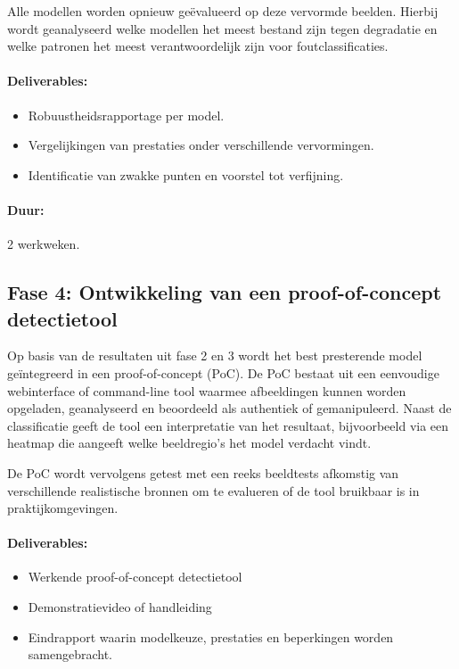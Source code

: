 \documentclass{hogent-article}
\begin{document}
Alle modellen worden opnieuw geëvalueerd op deze vervormde beelden. Hierbij wordt geanalyseerd welke modellen het meest bestand zijn tegen degradatie en welke patronen het meest verantwoordelijk zijn voor foutclassificaties.

\paragraph{Deliverables:}
\begin{itemize}
    \item Robuustheidsrapportage per model.
    \item Vergelijkingen van prestaties onder verschillende vervormingen.
    \item Identificatie van zwakke punten en voorstel tot verfijning.
\end{itemize}

\paragraph{Duur:} 2 werkweken.

\subsection{Fase 4: Ontwikkeling van een proof-of-concept detectietool}

Op basis van de resultaten uit fase 2 en 3 wordt het best presterende model geïntegreerd in een proof-of-concept (PoC). De PoC bestaat uit een eenvoudige webinterface of command-line tool waarmee afbeeldingen kunnen worden opgeladen, geanalyseerd en beoordeeld als authentiek of gemanipuleerd. Naast de classificatie geeft de tool een interpretatie van het resultaat, bijvoorbeeld via een heatmap die aangeeft welke beeldregio's het model verdacht vindt.

De PoC wordt vervolgens getest met een reeks beeldtests afkomstig van verschillende realistische bronnen om te evalueren of de tool bruikbaar is in praktijkomgevingen.

\paragraph{Deliverables:}
\begin{itemize}
    \item Werkende proof-of-concept detectietool
    \item Demonstratievideo of handleiding
    \item Eindrapport waarin modelkeuze, prestaties en beperkingen worden samengebracht.
\end{itemize}
    
\end{document}
